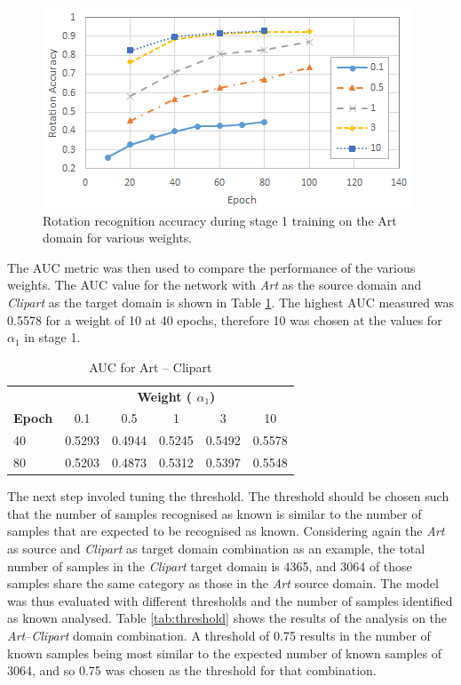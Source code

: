 \documentclass[10pt,twocolumn,letterpaper]{article}
\begin{document}
\begin{figure}[!htb]
  \centering
   \includegraphics[width=0.95\linewidth]{Figures/RotAcc.png}
   \caption{Rotation recognition accuracy during stage 1 training on the Art domain for various weights.}
   \label{fig:RotAcc}
\end{figure}

The AUC metric was then used to compare the performance of the various weights. The AUC value for the network with \textit{Art} as the source domain and \textit{Clipart} as the target domain is shown in Table \ref{tab:auc}. The highest AUC measured was 0.5578 for a weight of 10 at 40 epochs, therefore 10 was chosen at the values for $\alpha_1$ in stage 1. 

\begin{table}[!htb]
  \centering
  \begin{tabular}{@{}|l|ccccc|@{}}
    \hline
     & \multicolumn{5}{c|}{\textbf{Weight ( $\alpha_1$)}}\\
 \textbf{Epoch} & 0.1 & 0.5 & 1 & 3 & 10 \\
    \hline 
    40 & 0.5293 & 0.4944 & 0.5245 & 0.5492 & 0.5578 \\
   80 & 0.5203 & 0.4873 & 0.5312 & 0.5397 & 0.5548 \\
    \hline
  \end{tabular}
  \caption{AUC for Art -- Clipart}
  \label{tab:auc}
\end{table}

The next step involed tuning the threshold. The threshold should be chosen such that the number of samples recognised as known is similar to the number of samples that are expected to be recognised as known. Considering again the \textit{Art} as source and \textit{Clipart} as target domain combination as an example, the total number of samples in the \textit{Clipart} target domain is 4365, and 3064 of those samples share the same category as those in the \textit{Art} source domain. The model was thus evaluated with different thresholds and the number of samples identified as known analysed. Table \ref{tab:threshold} shows the results of the analysis on the \textit{Art}--\textit{Clipart} domain combination. A threshold of 0.75 results in the number of known samples being most similar to the expected number of known samples of 3064, and so 0.75 was chosen as the threshold for that combination.
\end{document}
